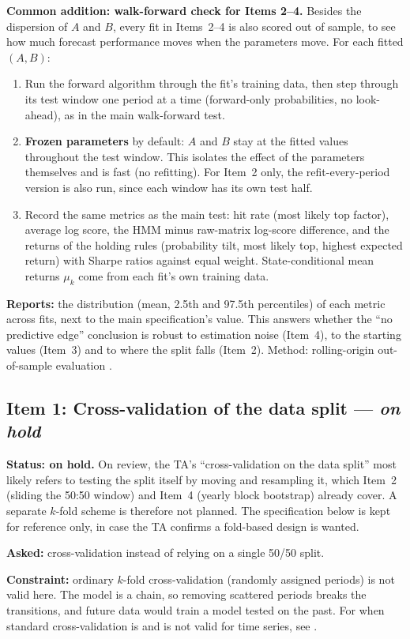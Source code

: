 \documentclass[11pt]{article}
\begin{document}
\textbf{Common addition: walk-forward check for Items 2--4.} Besides the dispersion of $A$ and $B$, every fit in Items~2--4 is also scored out of sample, to see how much forecast performance moves when the parameters move. For each fitted $(A,B)$:
\begin{enumerate}
\item Run the forward algorithm through the fit's training data, then step through its test window one period at a time (forward-only probabilities, no look-ahead), as in the main walk-forward test.
\item \textbf{Frozen parameters} by default: $A$ and $B$ stay at the fitted values throughout the test window. This isolates the effect of the parameters themselves and is fast (no refitting). For Item~2 only, the refit-every-period version is also run, since each window has its own test half.
\item Record the same metrics as the main test: hit rate (most likely top factor), average log score, the HMM minus raw-matrix log-score difference, and the returns of the holding rules (probability tilt, most likely top, highest expected return) with Sharpe ratios against equal weight. State-conditional mean returns $\mu_k$ come from each fit's own training data.
\end{enumerate}
\textbf{Reports:} the distribution (mean, 2.5th and 97.5th percentiles) of each metric across fits, next to the main specification's value. This answers whether the ``no predictive edge'' conclusion is robust to estimation noise (Item~4), to the starting values (Item~3) and to where the split falls (Item~2). Method: rolling-origin out-of-sample evaluation \citep{tashman2000}.

\subsection{Item 1: Cross-validation of the data split --- \emph{on hold}}
\textbf{Status: on hold.} On review, the TA's ``cross-validation on the data split'' most likely refers to testing the split itself by moving and resampling it, which Item~2 (sliding the 50:50 window) and Item~4 (yearly block bootstrap) already cover. A separate $k$-fold scheme is therefore not planned. The specification below is kept for reference only, in case the TA confirms a fold-based design is wanted.

\textbf{Asked:} cross-validation instead of relying on a single 50/50 split.

\textbf{Constraint:} ordinary $k$-fold cross-validation (randomly assigned periods) is not valid here. The model is a chain, so removing scattered periods breaks the transitions, and future data would train a model tested on the past. For when standard cross-validation is and is not valid for time series, see \citet{bergmeir2018}.
\end{document}
